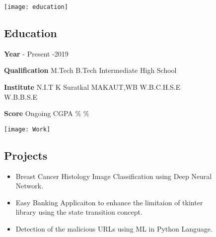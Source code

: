 \documentclass[12pt]{article}
\begin{document}
\begin{figure}[!hbt]
\hrulefill

\vspace{0.1in}
\begin{minipage}{0.45\textwidth}
\texttt{[image: education]}
\vspace*{-0.2in}
\subsection*{Education}
\bigbreak
\bigbreak

\vspace{-0.1in}
\end{minipage}

   \begin{minipage}{0.22\textwidth}            
		\textbf{Year}        
         - Present
      	 -2019
	\end{minipage}
	\hfill
	\begin{minipage}{0.22\textwidth}
       \textbf{Qualification}        
        \bigbreak  		
		M.Tech
		\bigbreak
		B.Tech
		\bigbreak
		Intermediate
		\bigbreak
		High School
		\end{minipage}
		\hfill
	\begin{minipage}{0.22\textwidth}
		\textbf{Institute}        
        \bigbreak  
		N.I.T K Suratkal
		\bigbreak
		MAKAUT,WB
		\bigbreak
		W.B.C.H.S.E
		\bigbreak
		W.B.B.S.E

	\end{minipage}
	\hfill
	\begin{minipage}{0.22\textwidth}
       \textbf{Score}        
        \bigbreak  	
	Ongoing
	 CGPA
	\%
	\%
	\end{minipage}



\end{figure}
\hrulefill

\begin{figure}[!hbt]
	
	\begin{minipage}{1\textwidth}
		\texttt{[image: Work]}
		\vspace{-0.2in}
		\subsection*{Projects}
		\begin{itemize}
			\item
			Breast Cancer Histology Image Classification using Deep Neural Network.
			\item
			Easy Banking Applicaiton to enhance the limitaion of tkinter library using the state transition concept.
			\item
			Detection of the malicious URLs using ML in Python Language.
			
		\end{itemize}
	\end{minipage}
\end{figure}
\hrulefill
\newpage
\end{document}
